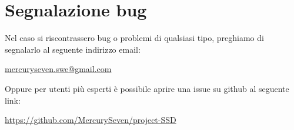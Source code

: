 \section{Segnalazione bug}

Nel caso si riscontrassero bug o problemi di qualsiasi tipo, preghiamo di segnalarlo al seguente indirizzo email:

\centerline{\url{mercuryseven.swe@gmail.com}}

Oppure per utenti più esperti è possibile aprire una issue su github al seguente link:

\centerline{\url{https://github.com/MercurySeven/project-SSD}}
